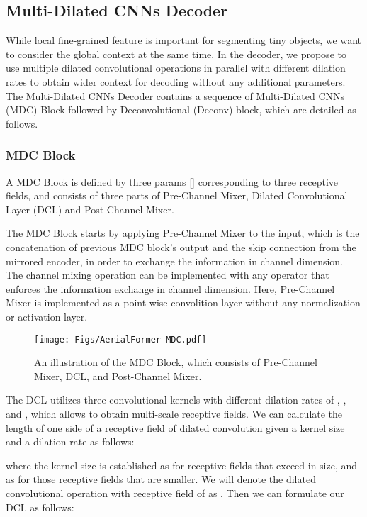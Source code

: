 \documentclass[journal]{IEEEtran}
\begin{document}
\subsection{Multi-Dilated CNNs Decoder}
While local fine-grained feature is important for segmenting tiny objects, we want to consider the global context at the same time.
In the decoder, we propose to use multiple dilated convolutional operations in parallel with different dilation rates to obtain wider context for decoding without any additional parameters. The Multi-Dilated CNNs Decoder contains a sequence of Multi-Dilated CNNs (MDC) Block followed by Deconvolutional (Deconv) block, which are detailed as follows.

\subsubsection{MDC Block}
A MDC Block is defined by three params [] corresponding to three receptive fields, and consists of three parts of Pre-Channel Mixer, Dilated Convolutional Layer (DCL) and Post-Channel Mixer.


The MDC Block starts by applying Pre-Channel Mixer to the input, which is the concatenation of previous MDC block's output and the skip connection from the mirrored encoder, in order to exchange the information in channel dimension. The channel mixing operation can be implemented with any operator that enforces the information exchange in channel dimension. Here, Pre-Channel Mixer is implemented as a point-wise convolition layer without any normalization or activation layer.


\begin{figure}
    \centering
    \texttt{[image: Figs/AerialFormer-MDC.pdf]}
    \caption{An illustration of the MDC Block, which consists of Pre-Channel Mixer, DCL, and Post-Channel Mixer.}
    \label{fig:mdc}
\end{figure}

The DCL utilizes three convolutional kernels with different dilation rates of , , and , which allows to obtain multi-scale receptive fields.   
We can calculate the length of one side of a receptive field  of dilated convolution given a kernel size  and a dilation rate  as follows:  



where the kernel size  is established as  for receptive fields that exceed  in size, and as  for those receptive fields that are smaller. 
We will denote the dilated convolutional operation with receptive field of  as . Then we can formulate our DCL as follows: 
\end{document}
